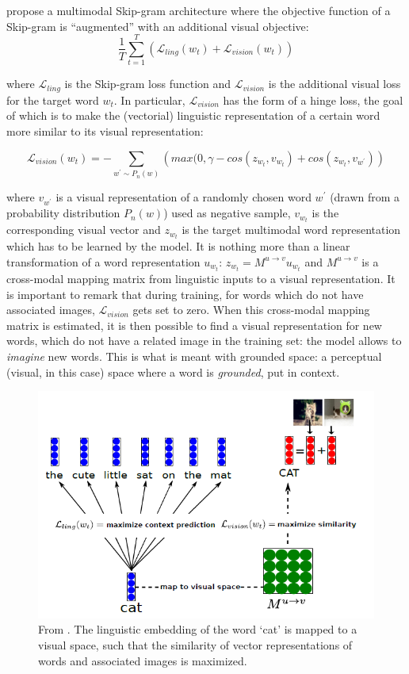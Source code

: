 \documentclass[
]{krantz}
\begin{document}
\citet{lazaridou2015combining} propose a multimodal Skip-gram architecture where the objective function of a Skip-gram is ``augmented'' with an additional visual objective: \[\frac{1}{T}\sum_{t=1}^{T}\left(\mathcal{L}_{ling}(w_{t})+\mathcal{L}_{vision}(w_{t})\right)\]

where \(\mathcal{L}_{ling}\) is the Skip-gram loss function and \(\mathcal{L}_{vision}\) is the additional visual loss for the target word \(w_{t}\). In particular, \(\mathcal{L}_{vision}\) has the form of a hinge loss, the goal of which is to make the (vectorial) linguistic representation of a certain word more similar to its visual representation:

\[\mathcal{L}_{vision}(w_{t})=-\sum_{w^{'}\sim P_{n}(w)}\left(max(0,\gamma-cos(z_{w_{t}},v_{w_{t}})+cos(z_{w_{t}},v_{w^{'}})\right)\]

where \(v_{w^{'}}\) is a visual representation of a randomly chosen word \(w^{'}\) (drawn from a probability distribution \(P_{n}(w)\)) used as negative sample, \(v_{w_{t}}\) is the corresponding visual vector and \(z_{w_{t}}\) is the target multimodal word representation which has to be learned by the model. It is nothing more than a linear transformation of a word representation \(u_{w_{t}}\): \(z_{w_{t}}=M^{u\rightarrow v}u_{w_{t}}\) and \(M^{u\rightarrow v}\) is a cross-modal mapping matrix from linguistic inputs to a visual representation. It is important to remark that during training, for words which do not have associated images, \(\mathcal{L}_{vision}\) gets set to zero. When this cross-modal mapping matrix is estimated, it is then possible to find a visual representation for new words, which do not have a related image in the training set: the model allows to \emph{imagine} new words. This is what is meant with grounded space: a perceptual (visual, in this case) space where a word is \emph{grounded}, put in context.

\begin{figure}

{\centering \includegraphics[width=0.8\linewidth]{figures/02-03-img-support-text/img-lazaridou2015combining01} 

}

\caption{From \citet{lazaridou2015combining}. The linguistic embedding of the word `cat' is mapped to a visual space, such that the similarity of vector representations of words and associated images is maximized.}\label{fig:img-lazaridou2015-01}
\end{figure}
\end{document}

